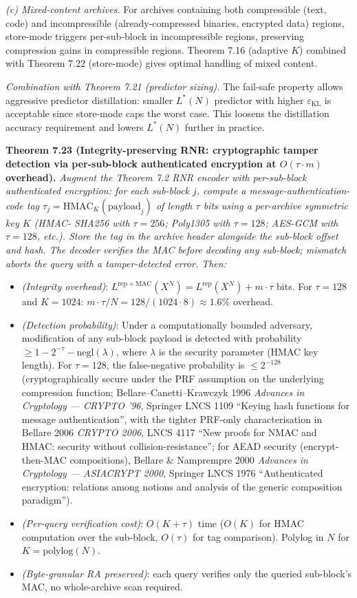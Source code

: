 \documentclass[
]{article}
\begin{document}
\emph{(c) Mixed-content archives.} For archives containing both
compressible (text, code) and incompressible (already-compressed
binaries, encrypted data) regions, store-mode triggers per-sub-block
in incompressible regions, preserving compression gains in
compressible regions. Theorem 7.16 (adaptive $K$) combined with
Theorem 7.22 (store-mode) gives optimal handling of mixed content.

\emph{Combination with Theorem 7.21 (predictor sizing).} The
fail-safe property allows aggressive predictor distillation:
smaller $L^*(N)$ predictor with higher $\varepsilon_{\mathrm{KL}}$ is
acceptable since store-mode caps the worst case. This loosens the
distillation accuracy requirement and lowers $L^*(N)$ further in
practice.

\textbf{Theorem 7.23 (Integrity-preserving RNR: cryptographic tamper
detection via per-sub-block authenticated encryption at $O(\tau \cdot
m)$ overhead).}
\emph{Augment the Theorem 7.2 RNR encoder with per-sub-block
authenticated encryption: for each sub-block $j$, compute a
message-authentication-code tag $\tau_j = \mathrm{HMAC}_K(\mathrm{payload}_j)$
of length $\tau$ bits using a per-archive symmetric key $K$ (HMAC-
SHA256 with $\tau = 256$; Poly1305 with $\tau = 128$; AES-GCM with
$\tau = 128$, etc.). Store the tag in the archive header alongside the
sub-block offset and hash. The decoder verifies the MAC before
decoding any sub-block; mismatch aborts the query with a tamper-detected
error. Then:}
\begin{itemize}
\item \emph{(Integrity overhead)}: $L^{\mathrm{rep}+\mathrm{MAC}}(X^N) =
L^{\mathrm{rep}}(X^N) + m \cdot \tau$ bits. For $\tau = 128$ and
$K = 1024$: $m \cdot \tau / N = 128 / (1024 \cdot 8) \approx 1.6\%$
overhead.
\item \emph{(Detection probability)}: Under a computationally bounded
adversary, modification of any sub-block payload is detected with
probability $\geq 1 - 2^{-\tau} - \mathrm{negl}(\lambda)$, where
$\lambda$ is the security parameter (HMAC key length). For
$\tau = 128$, the false-negative probability is $\leq 2^{-128}$
(cryptographically secure under the PRF assumption on the underlying
compression function; Bellare--Canetti--Krawczyk 1996 \emph{Advances
in Cryptology --- CRYPTO '96}, Springer LNCS 1109 ``Keying hash
functions for message authentication'', with the tighter PRF-only
characterisation in Bellare 2006 \emph{CRYPTO 2006},
LNCS 4117 ``New proofs for NMAC and HMAC: security without
collision-resistance''; for AEAD security (encrypt-then-MAC compositions),
Bellare \& Namprempre 2000 \emph{Advances in Cryptology --- ASIACRYPT
2000}, Springer LNCS 1976 ``Authenticated encryption: relations among
notions and analysis of the generic composition paradigm'').
\item \emph{(Per-query verification cost)}: $O(K + \tau)$ time
($O(K)$ for HMAC computation over the sub-block, $O(\tau)$ for tag
comparison). Polylog in $N$ for $K = \mathrm{polylog}(N)$.
\item \emph{(Byte-granular RA preserved)}: each query verifies only
the queried sub-block's MAC, no whole-archive scan required.
\end{itemize}
\end{document}

